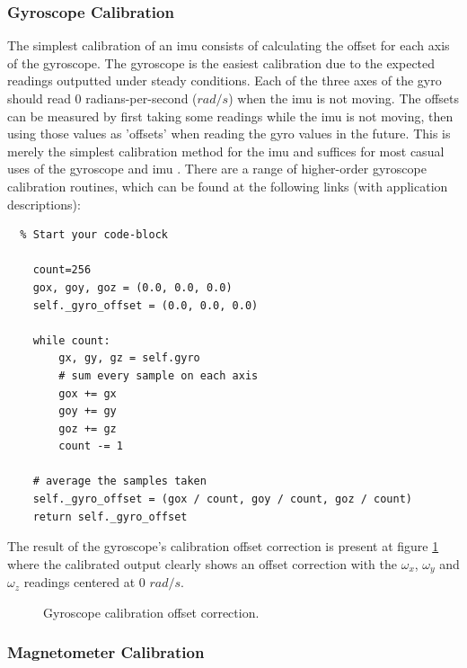 \subsubsection{Gyroscope Calibration}

The simplest calibration of an \acrshort{imu} consists of calculating the offset for each axis of the gyroscope. The gyroscope is the easiest calibration due to the expected readings outputted under steady conditions. Each of the three axes of the gyro should read 0 radians-per-second ($rad/s$) when the \acrshort{imu} is not moving. The offsets can be measured by first taking some readings while the \acrshort{imu} is not moving, then using those values as 'offsets' when reading the gyro values in the future. This is merely the simplest calibration method for the \acrshort{imu} and suffices for most casual uses of the gyroscope and \acrshort{imu} \cite{olivares2009high}. There are a range of  higher-order gyroscope calibration routines, which can be found at the following links (with application descriptions):
\clearpage
\lstset{language=Python}

\begin{lstlisting}  % Start your code-block

    count=256
    gox, goy, goz = (0.0, 0.0, 0.0)
    self._gyro_offset = (0.0, 0.0, 0.0) 

    while count:
        gx, gy, gz = self.gyro
        # sum every sample on each axis
        gox += gx
        goy += gy
        goz += gz
        count -= 1

    # average the samples taken
    self._gyro_offset = (gox / count, goy / count, goz / count)
    return self._gyro_offset
\end{lstlisting}

The result of the gyroscope's calibration offset correction is present at figure \ref{fig:gyroscope_calibration} where the calibrated output clearly shows an offset correction with the $\omega_x$, $\omega_y$  and $\omega_z$ readings centered at 0 $rad/s$.

\begin{figure}[!h]
    \centering
    \resizebox{0.8\linewidth}{!}{}
    \caption{Gyroscope calibration offset correction.}
    \label{fig:gyroscope_calibration}
\end{figure}

\subsubsection{Magnetometer Calibration}

